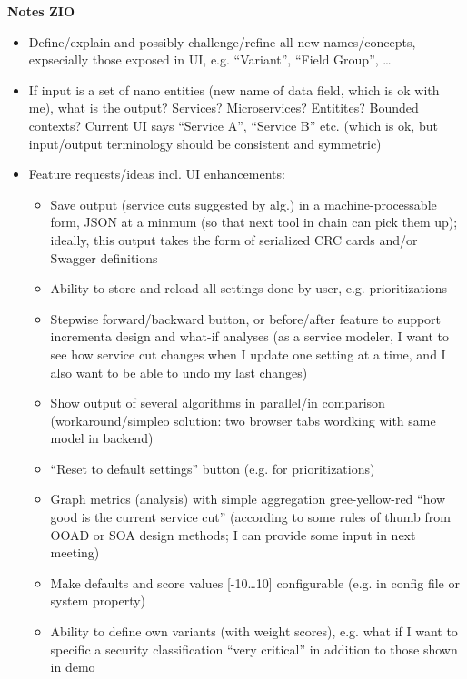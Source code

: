 \textbf{Notes ZIO}
\begin{itemize}
\item Define/explain and possibly challenge/refine all new names/concepts, expsecially those exposed in UI, e.g. \enquote{Variant}, \enquote{Field Group}, \dots
\item If input is a set of nano entities (new name of data field, which is ok with me), what is the output? Services? Microservices? Entitites? Bounded contexts? Current UI says \enquote{Service A}, \enquote{Service B} etc. (which is ok, but input/output terminology should be consistent and symmetric) 
\item Feature requests/ideas incl. UI enhancements:

	\begin{itemize}
	\item Save output (service cuts suggested by alg.) in a machine-processable form, JSON at a minmum (so that next tool in chain can pick them up); ideally, this output takes the form of serialized CRC cards and/or Swagger definitions 
	\item Ability to store and reload all settings done by user, e.g. prioritizations
	\item Stepwise forward/backward button, or before/after feature to support incrementa design and what-if analyses (as a service modeler, I want to see how service cut changes when I update one setting at a time, and I also want to be able to undo my last changes)
	\item Show output of several algorithms in parallel/in comparison (workaround/simpleo solution: two browser tabs wordking with same model in backend)
	\item \enquote{Reset to default settings} button (e.g. for prioritizations)
	\item Graph metrics (analysis) with simple aggregation gree-yellow-red \enquote{how good is the current service cut} (according to some rules of thumb from OOAD or SOA design methods; I  can provide some input in next meeting)
	\item Make defaults and score values [-10…10] configurable (e.g. in config file or system property)
	\item Ability to define own variants (with weight scores), e.g. what if I want to specific a security classification \enquote{very critical} in addition to those shown in demo
	\end{itemize}

\end{itemize}

